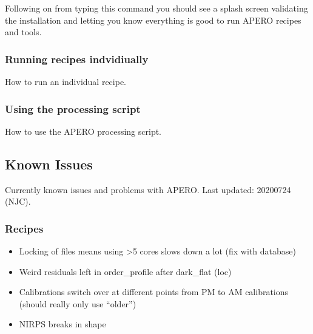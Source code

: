 \documentclass[a4paper,10pt,english]{report}
\begin{document}
Following on from typing this command you should see a splash screen validating the
installation and letting you know everything is good to run APERO recipes and tools.

\noindent{}


\subsubsection{Running recipes indvidiually}
\label{\detokenize{user/general/using_apero_default:running-recipes-indvidiually}}\label{\detokenize{user/general/using_apero_default:id1}}
How to run an individual recipe.


\subsubsection{Using the processing script}
\label{\detokenize{user/general/using_apero_default:using-the-processing-script}}\label{\detokenize{user/general/using_apero_default:using-apero-processing}}
How to use the APERO processing script.


\subsection{Known Issues}
\label{\detokenize{user/general/known_issues:known-issues}}\label{\detokenize{user/general/known_issues:id1}}\label{\detokenize{user/general/known_issues::doc}}
Currently known issues and problems with APERO.
Last updated: 2020\sphinxhyphen{}07\sphinxhyphen{}24 (NJC).


\subsubsection{Recipes}
\label{\detokenize{user/general/known_issues:recipes}}\begin{itemize}
\item {} 
Locking of files means using \textgreater{}5 cores slows down a lot (fix with database)

\item {} 
Weird residuals left in order\_profile after dark\_flat (loc)

\item {} 
Calibrations switch over at different points from PM to AM calibrations (should really only use “older”)

\item {} 
NIRPS breaks in shape

\end{itemize}
\end{document}
